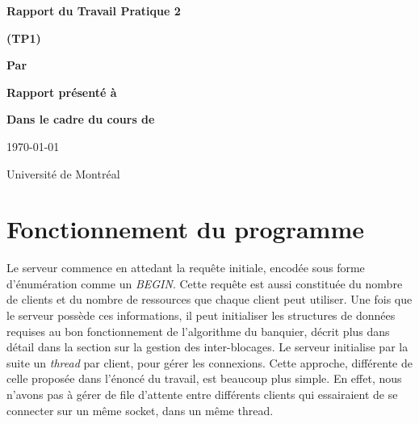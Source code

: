 \documentclass[letterpaper,12pt]{scrartcl}
\begin{document}
	\begin{center}
		\vspace{2cm}

		{\Huge\bf\sf Rapport du Travail Pratique 2}

		\vspace{0.5cm}

		{\bf\sf (TP1)}

		\vspace{4cm}

		{\bf\sf Par}

		\vspace{0.5cm}{\large\bf\sf Charles Langlois et François Poitras}

		\vspace{2cm}

		{\bf\sf Rapport présenté à}

		\vspace{0.5cm}{\large\bf\sf M. Stefan Monnier}

		\vspace{2cm}

		{\bf\sf Dans le cadre du cours de}

		\vspace{0.5cm}{\large\bf\sf Systèmes d'exploitation (IFT2245)}

		\vspace{\fill}
		\today

		\vspace{0.5cm}Université de Montréal
	\end{center}
	
	\newpage

	\pagestyle{cb}
	
	\tableofcontents

	\newpage
	\section{Fonctionnement du programme}
	Le serveur commence en attedant la requête initiale, encodée sous forme d'énumération comme un \textit{BEGIN}. Cette requête est aussi constituée du nombre de clients et du nombre de ressources que chaque client peut utiliser. Une fois que le serveur possède ces informations, il peut initialiser les structures de données requises au bon fonctionnement de l'algorithme du banquier, décrit plus dans détail dans la section sur la gestion des inter-blocages. Le serveur initialise par la suite un \textit{thread} par client, pour gérer les connexions. Cette approche, différente de celle proposée dans l'énoncé du travail, est beaucoup plus simple. En effet, nous n'avons pas à gérer de file d'attente entre différents clients qui essairaient de se connecter sur un même socket, dans un même thread.
\end{document}
